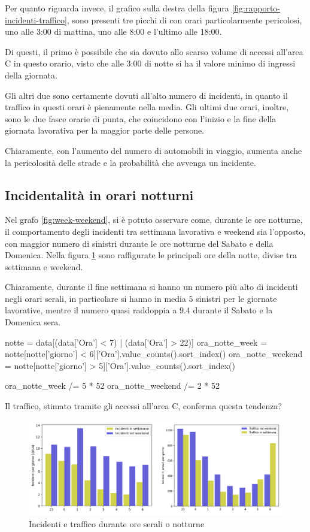 \documentclass[a4paper,12pt]{report}
\begin{document}
Per quanto riguarda invece, il grafico sulla destra della 
figura \ref{fig:rapporto-incidenti-traffico}, sono presenti tre picchi di 
con orari particolarmente pericolosi, uno alle 3:00 di mattina, uno alle 
8:00 e l'ultimo alle 18:00. 

Di questi, il primo è possibile che sia dovuto allo scarso volume di accessi 
all'area C in questo orario, visto che alle 3:00 di notte si ha il valore minimo di 
ingressi della giornata.

Gli altri due sono certamente dovuti all'alto 
numero di incidenti, in quanto il traffico in questi orari è pienamente nella media.
Gli ultimi due orari, inoltre, sono le due fasce orarie di punta, che coincidono 
con l'inizio e la fine della giornata lavorativa per la maggior parte delle persone. 

Chiaramente, con l'aumento del numero di automobili in viaggio, aumenta anche 
la pericolosità delle strade e la probabilità che avvenga un incidente.

\subsection{Incidentalità in orari notturni}

Nel grafo \ref{fig:week-weekend}, si è potuto osservare come, durante le 
ore notturne, il comportamento degli incidenti tra settimana lavorativa e weekend 
sia l'opposto, con maggior numero di sinistri durante le ore notturne del 
Sabato e della Domenica.
Nella figura \ref{fig:ore-notte} sono raffigurate le principali ore della notte, divise tra 
settimana e weekend.

Chiaramente, durante il fine settimana si hanno un numero 
più alto di incidenti negli orari serali, 
in particolare si hanno in media $5$ sinistri per le giornate lavorative, 
mentre il numero quasi raddoppia a $9.4$ durante il Sabato e la Domenica sera.

\begin{code}
notte = data[(data['Ora'] < 7) | (data['Ora'] > 22)]
ora_notte_week = notte[notte['giorno'] < 6]['Ora'].value_counts().sort_index()
ora_notte_weekend = notte[notte['giorno'] > 5]['Ora'].value_counts().sort_index()

ora_notte_week /= 5 * 52  
ora_notte_weekend /= 2 * 52
\end{code}

Il traffico, stimato tramite gli accessi all'area C, conferma questa tendenza?

\begin{figure}
    \includegraphics[width=\linewidth]{img_unite/ore_punta.png}
    \caption{Incidenti e traffico durante ore serali o notturne}
    \label{fig:ore-notte}
\end{figure}
\end{document}
